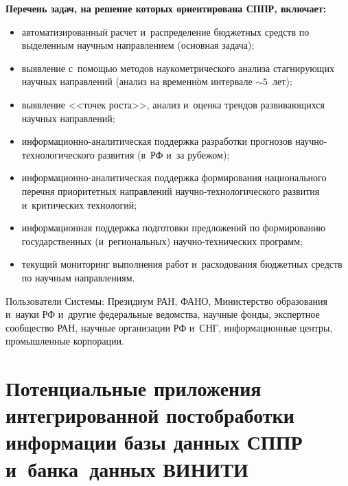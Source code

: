 \begin{multicols}{2}
    \textbf{Перечень задач, на решение которых ориентирована СППР, 
включает:}
    \begin{itemize} 
\item  автоматизированный расчет и~распределение бюджетных средств по 
выделенным научным на\-прав\-ле\-ни\-ем (основная задача);
\item выявление с~помощью методов наукометрического анализа стагнирующих 
научных на\-прав\-ле\-ний (анализ на временн$\acute{\mbox{о}}$м интервале $\sim5$~лет);
\item  выявление <<точек роста>>, анализ и~оценка трендов развивающихся 
научных на\-прав\-ле\-ний;
    \item информационно-ана\-ли\-ти\-че\-ская поддержка разработки 
прогнозов на\-уч\-но-тех\-но\-ло\-ги\-че\-ско\-го развития (в~РФ и~за рубежом);
    \item  информационно-ана\-ли\-ти\-че\-ская поддержка формирования 
национального перечня приоритетных на\-прав\-ле\-ний  
на\-уч\-но-тех\-но\-ло\-ги\-че\-ско\-го развития и~критических технологий;
    \item информационная поддержка подготовки предложений по 
формированию государственных (и~региональных) на\-уч\-но-тех\-ни\-че\-ских 
программ;
    \item текущий мониторинг выполнения работ и~расходования бюджетных 
средств по научным на\-прав\-ле\-ниям. 
    \end{itemize}
    
    Пользователи Системы: Президиум РАН, 
\mbox{ФАНО}, Министерство образования и~науки РФ и~другие федеральные 
ведомства, научные фонды, экспертное сообщество РАН, научные организации 
РФ и~СНГ, информационные центры, промышленные корпорации. 
    
    \section{ Потенциальные приложения интегрированной 
постобработки информации базы данных СППР и~банка~данных ВИНИТИ} 
    

\end{multicols}
